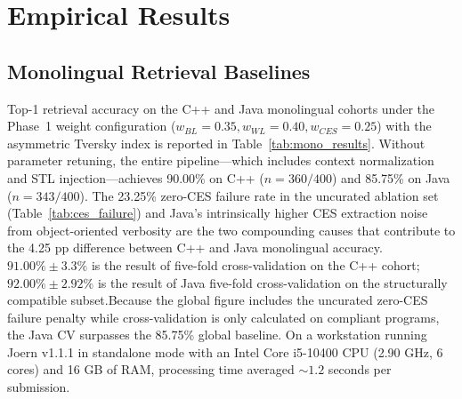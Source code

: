 \section{Empirical Results}
\label{sec:results}

\subsection{Monolingual Retrieval Baselines}
\label{subsec:mono_results}

Top-1 retrieval accuracy on the C++ and Java monolingual cohorts under the Phase~1 weight configuration ($w_{BL}=0.35, w_{WL}=0.40, w_{CES}=0.25$) with the asymmetric Tversky index is reported in Table~\ref{tab:mono_results}. Without parameter retuning, the entire pipeline—which includes context normalization and STL injection—achieves 90.00\% on C++ ($n=360/400$) and 85.75\% on Java ($n=343/400$). The 23.25\% zero-CES failure rate in the uncurated ablation set (Table~\ref{tab:ces_failure}) and Java's intrinsically higher CES extraction noise from object-oriented verbosity are the two compounding causes that contribute to the 4.25 pp difference between C++ and Java monolingual accuracy. $91.00\% \pm 3.3\%$ is the result of five-fold cross-validation on the C++ cohort; $92.00\% \pm 2.92\%$ is the result of Java five-fold cross-validation on the structurally compatible subset.Because the global figure includes the uncurated zero-CES failure penalty while cross-validation is only calculated on compliant programs, the Java CV surpasses the 85.75\% global baseline. On a workstation running Joern v1.1.1 in standalone mode with an Intel Core i5-10400 CPU (2.90 GHz, 6 cores) and 16 GB of RAM, processing time averaged ${\sim}1.2$ seconds per submission. 

\begin{table}[ht] 
\caption{Monolingual Retrieval Accuracy. Phase~1 weights ($w_{BL}=0.35, w_{WL}=0.40, w_{CES}=0.25)$ with an asymmetric Tversky index ($\alpha=0.1$, $\beta=0.9$) are used in the results. The final, perfectly balanced 400-program assessment dataset is reflected in the Java monolingual accuracy (85.75\%); the discordant cells of Table~\ref{tab:mcnemar_contingency} are used to calculate the McNemar odds ratio (OR$=b/c=4.875$).}
\label{tab:mono_results}
\centering
{}
\end{table}

